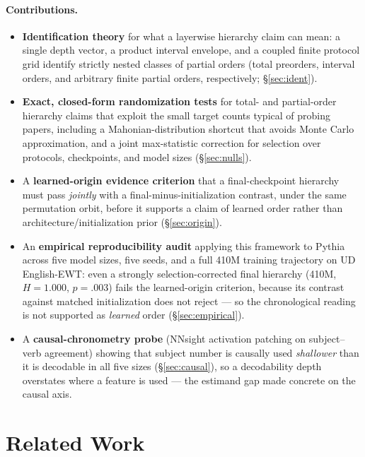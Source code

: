 \documentclass[11pt]{article}
\begin{document}
\paragraph{Contributions.}
\begin{itemize}[leftmargin=*]\itemsep0.15em
\item \textbf{Identification theory} for what a layerwise hierarchy claim can mean: a single depth vector, a product interval envelope, and a coupled finite protocol grid identify strictly nested classes of partial orders (total preorders, interval orders, and arbitrary finite partial orders, respectively; \S\ref{sec:ident}).
\item \textbf{Exact, closed-form randomization tests} for total- and partial-order hierarchy claims that exploit the small target counts typical of probing papers, including a Mahonian-distribution shortcut that avoids Monte Carlo approximation, and a joint max-statistic correction for selection over protocols, checkpoints, and model sizes (\S\ref{sec:nulls}).
\item A \textbf{learned-origin evidence criterion} that a final-checkpoint hierarchy must pass \emph{jointly} with a final-minus-initialization contrast, under the same permutation orbit, before it supports a claim of learned order rather than architecture/initialization prior (\S\ref{sec:origin}).
\item An \textbf{empirical reproducibility audit} applying this framework to Pythia across five model sizes, five seeds, and a full 410M training trajectory on UD English-EWT: even a strongly selection-corrected final hierarchy (410M, $H=1.000$, $p=.003$) fails the learned-origin criterion, because its contrast against matched initialization does not reject --- so the chronological reading is not supported as \emph{learned} order (\S\ref{sec:empirical}).
\item A \textbf{causal-chronometry probe} (NNsight activation patching on subject--verb agreement) showing that subject number is causally used \emph{shallower} than it is decodable in all five sizes (\S\ref{sec:causal}), so a decodability depth overstates where a feature is used --- the estimand gap made concrete on the causal axis.
\end{itemize}

\section{Related Work}
\label{sec:related}
\end{document}
